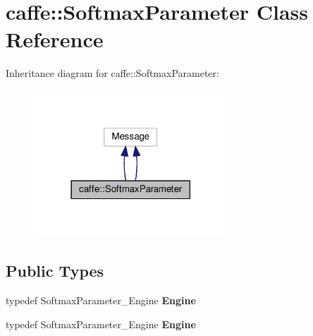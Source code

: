 \hypertarget{classcaffe_1_1_softmax_parameter}{}\section{caffe\+:\+:Softmax\+Parameter Class Reference}
\label{classcaffe_1_1_softmax_parameter}


Inheritance diagram for caffe\+:\+:Softmax\+Parameter\+:
\nopagebreak
\begin{figure}[H]
\begin{center}
\leavevmode
\includegraphics[width=206pt]{classcaffe_1_1_softmax_parameter__inherit__graph}
\end{center}
\end{figure}
\subsection*{Public Types}
\begin{DoxyCompactItemize}
\item 
\mbox{\label{classcaffe_1_1_softmax_parameter_a407c8eee2659468329d957a7fbc29f24}} 
typedef Softmax\+Parameter\+\_\+\+Engine {\bfseries Engine}
\item 
\mbox{\label{classcaffe_1_1_softmax_parameter_a407c8eee2659468329d957a7fbc29f24}} 
typedef Softmax\+Parameter\+\_\+\+Engine {\bfseries Engine}
\end{DoxyCompactItemize}
